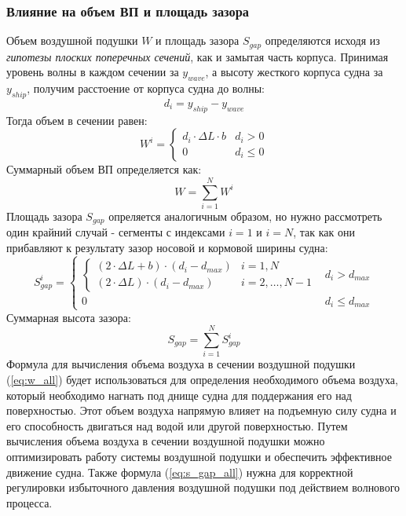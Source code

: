 \begin{centering}
    \subsubsection{Влияние на объем ВП и площадь зазора}
\end{centering}
Объем воздушной подушки $W$ и площадь зазора $S_{gap}$ определяются исходя из {\it гипотезы плоских поперечных сечений}, как и замытая часть корпуса. Принимая уровень волны в каждом сечении за $y_{wave}$, а высоту жесткого корпуса судна за $y_{ship}$, получим расстоение от корпуса судна до волны:
\begin{equation}
    d_i=y_{ship} - y_{wave}
\end{equation}
Тогда объем в сечении равен:
\begin{equation}
    W^i =
    \begin{cases}
        d_i \cdot \Delta L \cdot b & d_i > 0 \\
        0 & d_i \leq 0
    \end{cases}
\end{equation}
Суммарный объем ВП определяется как:
\begin{equation}\label{eq:w_all}
    W = \sum_{i=1}^{N} W^i
\end{equation}
Площадь зазора $S_{gap}$ опреляется аналогичным образом, но нужно рассмотреть один крайний случай - сегменты с индексами $i=1$ и $i=N$, так как они прибавляют к результату зазор носовой и кормовой ширины судна:
\begin{equation}
    S^i_{gap} =
    \begin{cases}
        \begin{cases}
            (2 \cdot \Delta L + b) \cdot (d_i - d_{max}) & i=1,N \\
            (2 \cdot \Delta L) \cdot (d_i - d_{max}) & i=2,\dots,N-1 
        \end{cases} & d_i > d_{max} \\
        0 & d_i \leq d_{max}
    \end{cases}
\end{equation}
Суммарная высота зазора:
\begin{equation}\label{eq:s_gap_all}
    S_{gap} = \sum_{i=1}^{N} S^i_{gap}
\end{equation}
Формула для вычисления объема воздуха в сечении воздушной подушки (\ref{eq:w_all}) будет использоваться для определения необходимого объема воздуха, который необходимо нагнать под днище судна для поддержания его над поверхностью. Этот объем воздуха напрямую влияет на подъемную силу судна и его способность двигаться над водой или другой поверхностью. Путем вычисления объема воздуха в сечении воздушной подушки можно оптимизировать работу системы воздушной подушки и обеспечить эффективное движение судна. Также формула (\ref{eq:s_gap_all}) нужна для корректной регулировки избыточного давления воздушной подушки под действием волнового процесса.